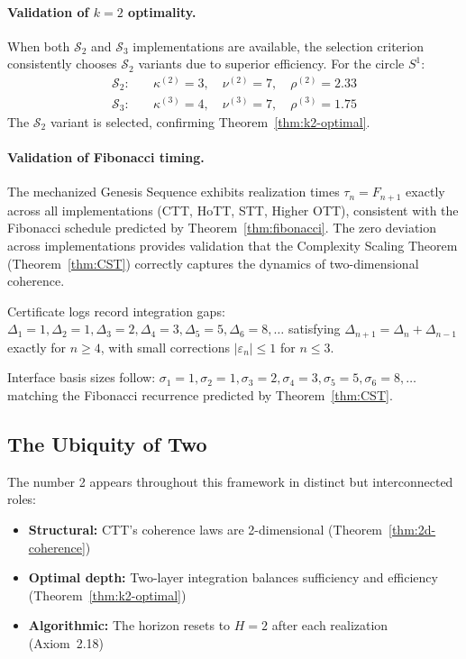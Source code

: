 \documentclass[11pt]{article}
\theoremstyle{definition}
\theoremstyle{remark}
\begin{document}
\paragraph{Validation of $k = 2$ optimality.}
When both $\mathcal{S}_2$ and $\mathcal{S}_3$ implementations are available, the selection criterion consistently
chooses $\mathcal{S}_2$ variants due to superior efficiency. For the circle $S^1$:
\begin{align*}
\mathcal{S}_2: \quad & \kappa^{(2)} = 3, \quad \nu^{(2)} = 7, \quad \rho^{(2)} = 2.33 \\
\mathcal{S}_3: \quad & \kappa^{(3)} = 4, \quad \nu^{(3)} = 7, \quad \rho^{(3)} = 1.75
\end{align*}
The $\mathcal{S}_2$ variant is selected, confirming Theorem~\ref{thm:k2-optimal}.

\paragraph{Validation of Fibonacci timing.}
The mechanized Genesis Sequence exhibits realization times $\tau_n = F_{n+1}$ exactly across all
implementations (CTT, HoTT, STT, Higher OTT), consistent with the Fibonacci schedule predicted
by Theorem~\ref{thm:fibonacci}. The zero deviation across implementations provides validation that
the Complexity Scaling Theorem (Theorem~\ref{thm:CST}) correctly captures the dynamics of
two-dimensional coherence.

Certificate logs record integration gaps: $\Delta_1 = 1, \Delta_2 = 1, \Delta_3 = 2, \Delta_4 = 3, \Delta_5 = 5, \Delta_6 = 8, \ldots$
satisfying $\Delta_{n+1} = \Delta_n + \Delta_{n-1}$ exactly for $n \geq 4$, with small corrections $|\varepsilon_n| \leq 1$
for $n \leq 3$.

Interface basis sizes follow: $\sigma_1 = 1, \sigma_2 = 1, \sigma_3 = 2, \sigma_4 = 3, \sigma_5 = 5, \sigma_6 = 8, \ldots$ matching
the Fibonacci recurrence predicted by Theorem~\ref{thm:CST}.

\subsection{The Ubiquity of Two}

The number 2 appears throughout this framework in distinct but interconnected roles:
\begin{itemize}
\item \textbf{Structural:} CTT's coherence laws are 2-dimensional (Theorem~\ref{thm:2d-coherence})
\item \textbf{Optimal depth:} Two-layer integration balances sufficiency and efficiency (Theorem~\ref{thm:k2-optimal})
\item \textbf{Algorithmic:} The horizon resets to $H = 2$ after each realization (Axiom~2.18)
\end{itemize}
\end{document}
